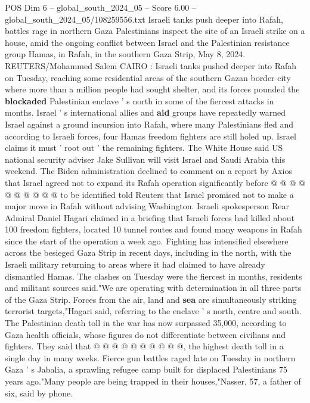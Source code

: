 \begin{textsample}{POS Dim 6 – global\_south\_2024\_05 – Score 6.00 – global\_south\_2024\_05/108259556.txt}  \label{ex:f6_pos_152}
Israeli tanks push deeper into Rafah, battles rage in northern Gaza Palestinians inspect the site of an Israeli strike on a house, amid the ongoing conflict between Israel and the Palestinian resistance group Hamas, in Rafah, in the southern Gaza Strip, May 8, 2024.
REUTERS/Mohammed Salem CAIRO : Israeli tanks pushed deeper into Rafah on Tuesday, reaching some residential areas of the southern Gazan border city where more than a million people had sought shelter, and its forces pounded the \textbf{blockaded} Palestinian enclave ' s north in some of the fiercest attacks in months.
Israel ' s international allies and \textbf{aid} groups have repeatedly warned Israel against a ground incursion into Rafah, where many Palestinians fled and according to Israeli forces, four Hamas freedom fighters are still holed up.
Israel claims it must ' root out ' the remaining fighters.
The White House said US national security adviser Jake Sullivan will visit Israel and Saudi Arabia this weekend.
The Biden administration declined to comment on a report by Axios that Israel agreed not to expand its Rafah operation significantly before @ @ @ @ @ @ @ @ @ @ to be identified told Reuters that Israel promised not to make a major move in Rafah without advising Washington.
Israeli spokesperson Rear Admiral Daniel Hagari claimed in a briefing that Israeli forces had killed about 100 freedom fighters, located 10 tunnel routes and found many weapons in Rafah since the start of the operation a week ago.
Fighting has intensified elsewhere across the besieged Gaza Strip in recent days, including in the north, with the Israeli military returning to areas where it had claimed to have already dismantled Hamas.
The clashes on Tuesday were the fiercest in months, residents and militant sources said."We are operating with determination in all three parts of the Gaza Strip.
Forces from the air, land and \textbf{sea} are simultaneously striking terrorist targets,"Hagari said, referring to the enclave ' s north, centre and south.
The Palestinian death toll in the war has now surpassed 35,000, according to Gaza health officials, whose figures do not differentiate between civilians and fighters.
They said that @ @ @ @ @ @ @ @ @ @, the highest death toll in a single day in many weeks.
Fierce gun battles raged late on Tuesday in northern Gaza ' s Jabalia, a sprawling refugee camp built for displaced Palestinians 75 years ago."Many people are being trapped in their houses,"Nasser, 57, a father of six, said by phone.

\end{textsample}
